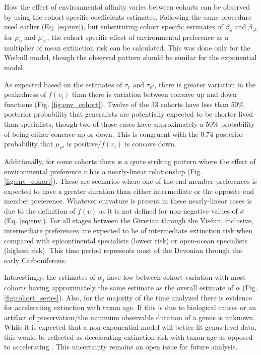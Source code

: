\documentclass{article}
\begin{document}
How the effect of environmental affinity varies between cohorts can be observed by using the cohort specific coefficients estimates. Following the same procedure used earlier (Eq. \ref{eq:env}), but substituting cohort specific estimates of \(\beta_{v}\) and \(\beta_{v^{2}}\) for \(\mu_{v}\) and \(\mu_{v^{2}}\), the cohort specific effect of environmental preference as a multiplier of mean extinction risk can be calculated. This was done only for the Weibull model, though the observed pattern should be similar for the exponential model. 

As expected based on the estimates of \(\tau_{v}\) and \(\tau_{v^{2}}\), there is greater variation in the peakedness of \(f(v_{i})\) than there is variation between convave up and down functions (Fig. \ref{fig:env_cohort}). Twelve of the 33 cohorts have less than 50\% posterior probability that generalists are potentially expected to be shorter lived than specialists, though two of those cases have approximately a 50\% probability of being either concave up or down. This is congruent with the 0.74 posterior probability that \(\mu_{v^{2}}\) is positive/\(f(v_{i})\) is concave down.

Additionally, for some cohorts there is a quite striking pattern where the effect of environmental preference \(v\) has a nearly-linear relationship (Fig. \ref{fig:env_cohort}). These are scenarios where one of the end member preferences is expected to have a greater duration than either intermediate or the opposite end member preference. Whatever curvature is present in these nearly-linear cases is due to the definition of \(f(v)\) as it is not defined for non-negative values of \(\sigma\) (Eq. \ref{eq:env}). For all stages between the Givetian through the Vis\'{e}an, inclusive, intermediate preferences are expected to be of intermediate extinction risk when compared with epicontinental specialists (lowest risk) or open-ocean specialists (highest risk). This time period represents most of the Devonian through the early Carboniferous.

Interestingly, the estimates of \(\alpha_{j}\) have low between cohort variation with most cohorts having approximately the same estimate as the overall estimate of \(\alpha\) (Fig. \ref{fig:cohort_series}). Also, for the majority of the time analyzed there is evidence for accelerating extinction with taxon age. If this is due to biological causes \citep{Wagner2014b,Rosindell2015a} or an artifact of preservation/the minimum observable duration of a genus \citep{Sepkoski1975} is unknown. While it is expected that a non-exponential model will better fit genus-level data, this would be reflected as decelerating extinction risk with taxon age as opposed to accelerating \citep{Raup1975,Raup1978,Raup1985,Foote2001a}. This uncertainty remains an open issue for future analysis.
\end{document}
